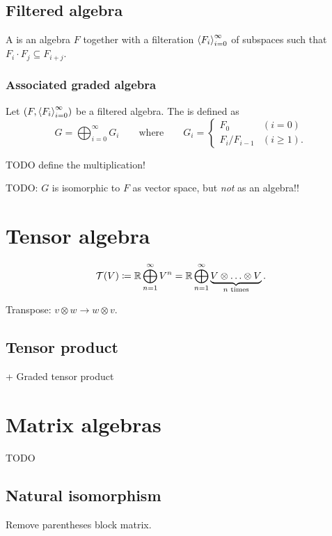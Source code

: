 \subsection{Filtered algebra}
\begin{definition}
A  is an algebra $F$ together with a filteration $\left\langle F_i \right\rangle_{i=0}^\infty$ of subspaces such that $F_i\cdot F_j \subseteq F_{i+j}$.
\end{definition}

\subsubsection{Associated graded algebra}
\begin{definition}
Let $\sSet{F,\seq{F_i}_{i=0}^\infty}$ be a filtered algebra. The  is defined as
\[ G = \bigoplus_{i=0}^\infty G_i \qquad\text{where}\qquad G_i = \begin{cases}
F_0 & (i=0) \\
F_{i}/F_{i-1} & (i \geq 1).
\end{cases} \]
\end{definition}
TODO define the multiplication!

TODO: $G$ is isomorphic to $F$ as vector space, but \emph{not} as an algebra!!


\section{Tensor algebra}
\[ \mathcal{T}(V) \coloneqq \mathbb{R} \bigoplus_{n=1}^\infty V^n = \mathbb{R} \bigoplus_{n=1}^\infty \underbrace{V\otimes \ldots \otimes V}_{\text{$n$ times}}. \]

Transpose: $v\otimes w \to w\otimes v$.

\subsection{Tensor product}
+ Graded tensor product

\section{Matrix algebras}
\begin{definition}
TODO
\end{definition}

\subsection{Natural isomorphism}
Remove parentheses block matrix.

